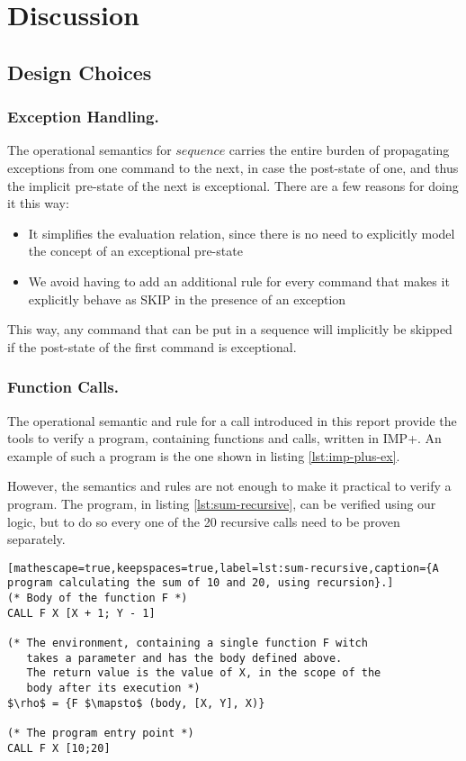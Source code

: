 \section{Discussion}

\subsection{Design Choices}

\subsubsection{Exception Handling.}
The operational semantics for $sequence$ carries the entire burden of propagating exceptions from one command to the next, in case the post-state of one, and thus the implicit pre-state of the next is exceptional. There are a few reasons for doing it this way:

\begin{itemize}
\item It simplifies the evaluation relation, since there is no need to explicitly model the concept of an exceptional pre-state
\item We avoid having to add an additional rule for every command that makes it explicitly behave as SKIP in the presence of an exception
\end{itemize}

This way, any command that can be put in a sequence will implicitly be skipped if the post-state of the first command is exceptional.

\subsubsection{Function Calls.}
The operational semantic and rule for a call introduced in this report provide the tools to verify a program, containing functions and calls, written in IMP+. An example of such a program is the one shown in listing \ref{lst:imp-plus-ex}.

However, the semantics and rules are not enough to make it practical to verify a program. The program, in listing \ref{lst:sum-recursive}, can be verified using our logic, but to do so every one of the 20 recursive calls need to be proven separately.

\begin{lstlisting}[mathescape=true,keepspaces=true,label=lst:sum-recursive,caption={A program calculating the sum of 10 and 20, using recursion}.]
(* Body of the function F *)
CALL F X [X + 1; Y - 1]

(* The environment, containing a single function F witch
   takes a parameter and has the body defined above.
   The return value is the value of X, in the scope of the 
   body after its execution *)
$\rho$ = {F $\mapsto$ (body, [X, Y], X)}

(* The program entry point *)
CALL F X [10;20]
\end{lstlisting}

